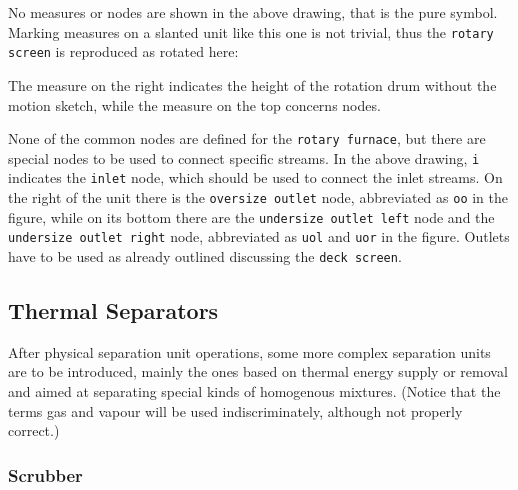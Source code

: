 \documentclass[12pt]{article}						%
\newcommand*{\chpn}[1]{\texttt{#1}}				%
\newcommand*{\chpp}[1]{\texttt{#1}}				%
\begin{document}
No measures or nodes are shown in the above drawing, that is the pure symbol.
Marking measures on a slanted unit like this one is not trivial, thus the
\chpp{rotary screen} is reproduced as rotated here:
\begin{center}
\end{center}
The measure on the right indicates the height of the rotation drum without the
motion sketch, while the measure on the top concerns nodes.

None of the common nodes are defined for the \chpn{rotary furnace}, but there are
special nodes to be used to connect specific streams. In the above drawing,
\chpn{i} indicates the \chpn{inlet} node, which should be used to connect the
inlet streams. On the right of the unit there is the \chpn{oversize outlet} node,
abbreviated as \chpn{oo} in the figure, while on its bottom there are the
\chpn{undersize outlet left} node and the \chpn{undersize outlet right} node,
abbreviated as \chpn{uol} and \chpn{uor} in the figure. Outlets have to be used
as already outlined discussing the \chpn{deck screen}.

\subsection{Thermal Separators}

After physical separation unit operations, some more complex separation units are
to be introduced, mainly the ones based on thermal energy supply or removal and
aimed at separating special kinds of homogenous mixtures. (Notice that the terms
gas and vapour will be used indiscriminately, although not properly correct.)

\subsubsection{Scrubber}
\end{document}
